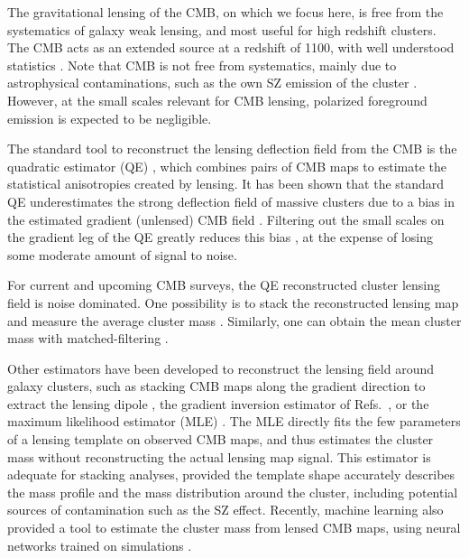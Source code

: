 \documentclass[prd, superscriptaddress, tightenlines, longbibliography, nofootinbib, eqsecnum, amsfonts, amsmath, floatfix, twocolumn, notitlepage]{revtex4-2}
\begin{document}

The gravitational lensing of the CMB, on which we focus here, is free from the systematics of galaxy weak lensing, and most useful for high redshift clusters. 
The CMB acts as an extended source at a redshift of 1100, with well understood statistics \cite{Lewis:2006fu}.
Note that CMB is not free from systematics, mainly due to astrophysical contaminations, such as the own SZ emission of the cluster \cite{Madhavacheril:2018bxi, DES:2018myw, Patil_2020}.
However, at the small scales relevant for CMB lensing, polarized foreground emission is expected to be negligible.

The standard tool to reconstruct the lensing deflection field from the CMB is the quadratic estimator (QE) \cite{Hu:2001tn, Hu:2001kj, Okamoto:2003zw, Planck:2018lbu}, which combines pairs of CMB maps to estimate the statistical anisotropies created by lensing.
It has been shown that the standard QE underestimates the strong deflection field of massive clusters due to a bias in the estimated gradient (unlensed) CMB field \cite{Maturi:2004zj}. Filtering out the small scales on the gradient leg of the QE greatly reduces this bias \cite{Hu:2007bt}, at the expense of losing some moderate amount of signal to noise.

For current and upcoming CMB surveys, the QE reconstructed cluster lensing field is noise dominated. One possibility is to stack the reconstructed lensing map and measure the average cluster mass \cite{DES:2017fyz, Geach:2017crt, DES:2018myw, ACT:2020izl}. Similarly, one can obtain the mean cluster mass with matched-filtering \cite{Melin:2014uaa, Louis:2016gvv, Zubeldia:2019brr, Zubeldia:2020knz}.

Other estimators have been developed to reconstruct the lensing field around galaxy clusters, such as stacking CMB maps along the gradient direction to extract the lensing dipole \cite{SPT:2019qkp, Levy:2023moy}, the gradient inversion estimator of Refs.~\cite{Horowitz:2017iql, Hadzhiyska:2019cle}, or the maximum likelihood estimator (MLE) \cite{Lewis:2005fq,Baxter:2014frs, Raghunathan:2017cle}.
The MLE directly fits the few parameters of a lensing template on observed CMB maps, and thus estimates the cluster mass without reconstructing the actual lensing map signal. This estimator is adequate for stacking analyses, provided the template shape accurately describes the mass profile and the mass distribution around the cluster, including potential sources of contamination such as the SZ effect.
Recently, machine learning also provided a tool to estimate the cluster mass from lensed CMB maps, using neural networks trained on simulations \cite{Caldeira:2018ojb, Gupta:2020him, Parker:2022uxh}.
\end{document}
